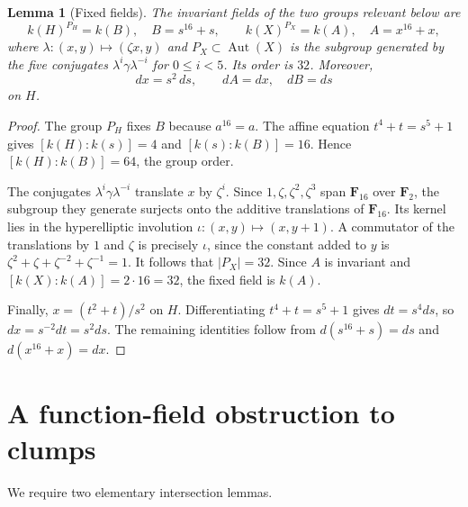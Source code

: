 \documentclass[11pt,a4paper,reqno]{amsart}
\newtheorem{lemma}[theorem]{Lemma}
\newcommand{\FF}{\mathbf F}
\newcommand{\Aut}{\operatorname{Aut}}
\begin{document}
\begin{lemma}[Fixed fields]\label{lem:fixed-fields}
The invariant fields of the two groups relevant below are
\[
  k(H)^{P_H}=k(B),\quad B=s^{16}+s,
  \qquad
  k(X)^{P_X}=k(A),\quad A=x^{16}+x,
\]
where $\lambda:(x,y)\mapsto(\zeta x,y)$ and $P_X\subset\Aut(X)$
is the subgroup generated by the five conjugates
$\lambda^i\gamma\lambda^{-i}$ for $0\le i<5$. Its order is $32$.
Moreover,
\begin{equation}\label{eq:diff-identity}
    dx=s^2\,ds,\qquad dA=dx,\quad dB=ds
\end{equation}
on $H$.
\end{lemma}
\begin{proof}
The group $P_H$ fixes $B$ because $a^{16}=a$.  The affine equation
$t^4+t=s^5+1$ gives $[k(H):k(s)]=4$ and
$[k(s):k(B)]=16$. Hence $[k(H):k(B)]=64$, the group order.

The conjugates $\lambda^i\gamma\lambda^{-i}$ translate $x$ by
$\zeta^i$. Since $1,\zeta,\zeta^2,\zeta^3$ span $\FF_{16}$ over
$\FF_2$, the subgroup they generate surjects onto the additive
translations of $\FF_{16}$. Its kernel lies in the hyperelliptic
involution $\iota:(x,y)\mapsto(x,y+1)$. A commutator of the
translations by $1$ and $\zeta$ is precisely $\iota$, since the
constant added to $y$ is
$\zeta^2+\zeta+\zeta^{-2}+\zeta^{-1}=1$.
It follows that $|P_X|=32$. Since $A$ is invariant and
$[k(X):k(A)]=2\cdot16=32$, the fixed field is $k(A)$.

Finally, $x=(t^2+t)/s^2$ on $H$. Differentiating
$t^4+t=s^5+1$ gives $dt=s^4ds$, so
$dx=s^{-2}dt=s^2ds$. The remaining identities follow from
$d(s^{16}+s)=ds$ and $d(x^{16}+x)=dx$.
\end{proof}

\section{A function-field obstruction to clumps}\label{sec:noclump}
We require two elementary intersection lemmas.
\end{document}
